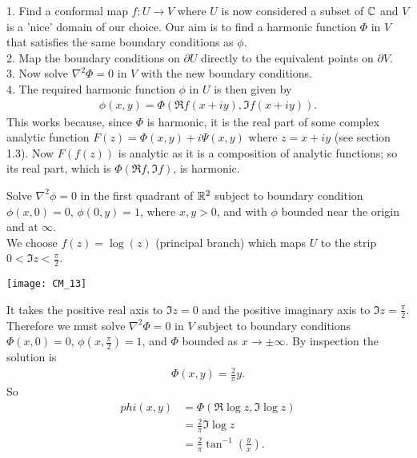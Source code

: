 \documentclass[a4paper]{article}
\begin{document}
1. Find a conformal map $f:U \to V$ where $U$ is now considered a subset of $\mathbb{C}$ and $V$ is a 'nice' domain of our choice. Our aim is to find a harmonic function $\Phi$ in $V$ that satisfies the same boundary conditions as $\phi$.\\
2. Map the boundary conditions on $\partial U$ directly to the equivalent points on $\partial V$.\\
3. Now solve $\nabla^2 \Phi =0$ in $V$ with the new boundary conditions.\\
4. The required harmonic function $\phi$ in $U$ is then given by
\begin{equation*}
\begin{aligned}
\phi(x,y) = \Phi(\Re f(x+iy), \Im f(x+iy)).
\end{aligned}
\end{equation*}
This works because, since $\Phi$ is harmonic, it is the real part of some complex analytic function $F(z) = \Phi(x,y) + i\Psi(x,y)$ where $z=x+iy$ (see section 1.3). Now $F(f(z))$ is analytic as it is a composition of analytic functions; so its real part, which is $\Phi(\Re f, \Im f)$, is harmonic.

\begin{eg}
Solve $\nabla^2 \phi = 0$ in the first quadrant of $\mathbb{R}^2$ subject to boundary condition $\phi(x,0) = 0$, $\phi(0,y) = 1$, where $x,y>0$, and with $\phi$ bounded near the origin and at $\infty$.\\
We choose $f(z) =\log(z)$ (principal branch) which maps $U$ to the strip $0<\Im z < \frac{\pi}{2}$.

\texttt{[image: CM\_13]}

It takes the positive real axis to $\Im z=0$ and the positive imaginary axis to $\Im z = \frac{\pi}{2}$. Therefore we must solve $\nabla^2 \Phi = 0$ in $V$ subject to boundary conditions $\Phi(x,0) = 0$, $\phi(x,\frac{\pi}{2}) = 1$, and $\Phi$ bounded as $x \to \pm \infty$. By inspection the solution is
\begin{equation*}
\begin{aligned}
\Phi(x,y) = \frac{2}{\pi} y.
\end{aligned}
\end{equation*}
So
\begin{equation*}
\begin{aligned}
phi(x,y) &= \Phi(\Re \log z, \Im \log z)\\
&=\frac{2}{\pi} \Im \log z\\
&=\frac{2}{\pi} \tan^{-1}\left(\frac{y}{x}\right).
\end{aligned}
\end{equation*}
\end{eg}
\end{document}
